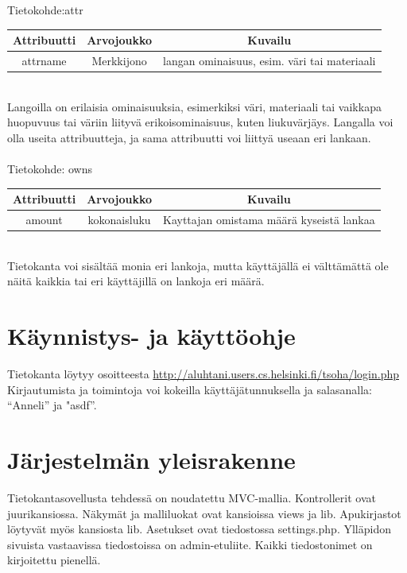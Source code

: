 \documentclass[12pt]{article}
\begin{document}
\ \\ \ \\
Tietokohde:attr\\
\begin{tabular}{|c|c|c|}
\hline
Attribuutti & Arvojoukko & Kuvailu \\
\hline
attrname & Merkkijono & langan ominaisuus, esim. väri tai materiaali\\
\hline   
\end{tabular}
\\
Langoilla on erilaisia ominaisuuksia, esimerkiksi väri, materiaali tai vaikkapa huopuvuus tai väriin liityvä erikoisominaisuus, kuten liukuvärjäys. Langalla voi olla useita attribuutteja, ja sama attribuutti voi liittyä useaan eri lankaan. 
\ \\ \ \\
Tietokohde: owns\\
\begin{tabular}{|c|c|c|}
\hline
Attribuutti & Arvojoukko & Kuvailu \\
\hline
amount & kokonaisluku & Kayttajan omistama määrä kyseistä lankaa\\
\hline  
\end{tabular}
\\
Tietokanta voi sisältää monia eri lankoja, mutta käyttäjällä ei välttämättä ole näitä kaikkia tai eri käyttäjillä on lankoja eri määrä. 
\section{Käynnistys- ja käyttöohje}
Tietokanta löytyy osoitteesta \href{http://aluhtani.users.cs.helsinki.fi/tsoha/login.php}{http://aluhtani.users.cs.helsinki.fi/tsoha/login.php}
\\
Kirjautumista ja toimintoja voi kokeilla käyttäjätunnuksella ja salasanalla: ``Anneli'' ja "asdf''.
\section{Järjestelmän yleisrakenne}
Tietokantasovellusta tehdessä on noudatettu MVC-mallia. Kontrollerit ovat juurikansiossa. Näkymät ja malliluokat ovat kansioissa views ja lib. Apukirjastot löytyvät myös kansiosta lib. Asetukset ovat tiedostossa settings.php. Ylläpidon sivuista vastaavissa tiedostoissa on admin-etuliite. Kaikki tiedostonimet on kirjoitettu pienellä. 
\end{document}
